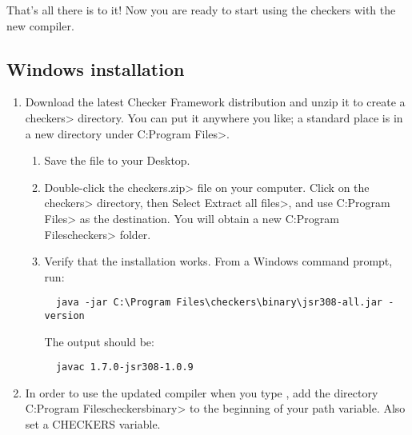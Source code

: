 That's all there is to it!  Now you are ready to start using the checkers with
the new  compiler.

\subsection{Windows installation\label{windows-installation}}

\begin{enumerate}

\item
  Download the latest Checker Framework distribution
  and unzip it to create a \<checkers> directory.  You can put it anywhere
  you like; a standard place is in a new directory under \<C:\ttbs{}Program
  Files>.

\begin{enumerate}
\item
  Save the file
  to your Desktop.
\item
  Double-click the \<checkers.zip> file on your computer.  Click on
  the \<checkers> directory, then Select \<Extract all files>, and use
  \<C:\ttbs{}Program Files> as the destination.  You will obtain a new
  \<C:\ttbs{}Program Files\ttbs{}checkers> folder.
\item
  Verify that the installation works.  From a Windows command prompt, run:

\begin{Verbatim}
  java -jar C:\Program Files\checkers\binary\jsr308-all.jar -version
\end{Verbatim}

The output should be:

\begin{Verbatim}
  javac 1.7.0-jsr308-1.0.9
\end{Verbatim}

\end{enumerate}


\item
  In order to use the updated compiler when you type , add the
  directory \<C:\ttbs{}Program Files\ttbs{}checkers\ttbs{}binary> to the
  beginning of your path variable.  Also set a CHECKERS variable.



\end{enumerate}
